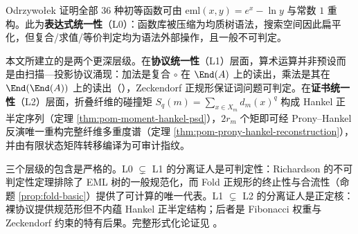 Odrzywołek \cite{Odrzywolek2026SingleBinaryOperator} 证明全部 36 种初等函数可由 $\mathrm{eml}(x,y)=e^x-\ln y$ 与常数 $1$ 重构。此为\textbf{表达式统一性}（L0）：函数库被压缩为均质树语法，搜索空间因此扁平化，但复合/求值/等价判定均为语法外部操作，且一般不可判定。

本文所建立的是两个更深层级。在\textbf{协议统一性}（L1）层面，算术运算并非预设而是由扫描—投影协议涌现：加法是复合 $\circ$ 在 $\End(A)$ 上的读出，乘法是其在 $\End(\End(A))$ 上的读出（\cite{OmegaHierarchy2026}），Zeckendorf 正规形保证词问题可判定。在\textbf{证书统一性}（L2）层面，折叠纤维的碰撞矩 $S_q(m)=\sum_{x\in X_m}d_m(x)^q$ 构成 Hankel 正半定序列（定理 \ref{thm:pom-moment-hankel-psd}），$2r_m$ 个矩即可经 Prony--Hankel 反演唯一重构完整纤维多重度谱（定理 \ref{thm:pom-prony-hankel-reconstruction}），并由有限状态矩阵转移编译为可审计指纹。

三个层级的包含是严格的。L0 $\subsetneq$ L1 的分离证人是可判定性：Richardson \cite{Richardson1968} 的不可判定性定理排除了 EML 树的一般规范化，而 Fold 正规形的终止性与合流性（命题 \ref{prop:fold-basic}）提供了可计算的唯一代表。L1 $\subsetneq$ L2 的分离证人是正定核：裸协议提供规范形但不内蕴 Hankel 正半定结构；后者是 Fibonacci 权重与 Zeckendorf 约束的特有后果。完整形式化论证见 \cite{OmegaHierarchy2026}。

